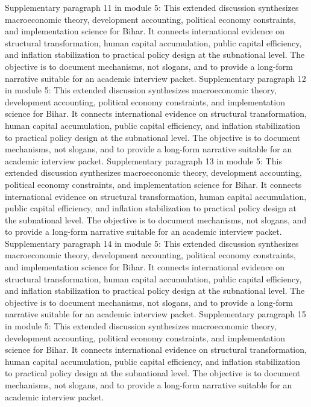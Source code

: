 \documentclass[preprint,12pt]{elsarticle}
\begin{document}
Supplementary paragraph 11 in module 5: This extended discussion synthesizes macroeconomic theory, development accounting, political economy constraints, and implementation science for Bihar. It connects international evidence on structural transformation, human capital accumulation, public capital efficiency, and inflation stabilization to practical policy design at the subnational level. The objective is to document mechanisms, not slogans, and to provide a long-form narrative suitable for an academic interview packet.
Supplementary paragraph 12 in module 5: This extended discussion synthesizes macroeconomic theory, development accounting, political economy constraints, and implementation science for Bihar. It connects international evidence on structural transformation, human capital accumulation, public capital efficiency, and inflation stabilization to practical policy design at the subnational level. The objective is to document mechanisms, not slogans, and to provide a long-form narrative suitable for an academic interview packet.
Supplementary paragraph 13 in module 5: This extended discussion synthesizes macroeconomic theory, development accounting, political economy constraints, and implementation science for Bihar. It connects international evidence on structural transformation, human capital accumulation, public capital efficiency, and inflation stabilization to practical policy design at the subnational level. The objective is to document mechanisms, not slogans, and to provide a long-form narrative suitable for an academic interview packet.
Supplementary paragraph 14 in module 5: This extended discussion synthesizes macroeconomic theory, development accounting, political economy constraints, and implementation science for Bihar. It connects international evidence on structural transformation, human capital accumulation, public capital efficiency, and inflation stabilization to practical policy design at the subnational level. The objective is to document mechanisms, not slogans, and to provide a long-form narrative suitable for an academic interview packet.
Supplementary paragraph 15 in module 5: This extended discussion synthesizes macroeconomic theory, development accounting, political economy constraints, and implementation science for Bihar. It connects international evidence on structural transformation, human capital accumulation, public capital efficiency, and inflation stabilization to practical policy design at the subnational level. The objective is to document mechanisms, not slogans, and to provide a long-form narrative suitable for an academic interview packet.
\end{document}
